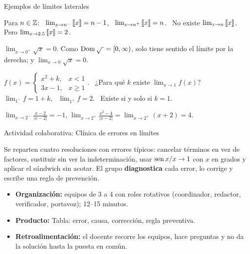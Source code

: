 \documentclass[10pt,aspectratio=169]{beamer}
\begin{document}
\begin{frame}{Ejemplos de límites laterales}
  \begin{ejemplo}
    Para $n\in\mathbb{Z}$: \ $\lim_{x\to n^-}\left\llbracket x\right\rrbracket=n-1$, \ $\lim_{x\to n^+}\left\llbracket x\right\rrbracket=n$. \ No existe $\lim_{x\to n}\left\llbracket x\right\rrbracket$.\\
    Pero $\lim_{x\to2.5}\left\llbracket x\right\rrbracket=2$.
  \end{ejemplo}
  \begin{ejemplo}
    $\lim_{x\to0^+}\sqrt x=0$. Como $\operatorname{Dom}\sqrt{\ }=[0,\infty)$, solo tiene sentido el límite por la derecha; y $\lim_{x\to0}\sqrt x=0$.
  \end{ejemplo}
  \begin{ejemplo}
    $f(x)=\begin{cases}x^2+k,&x<1\\ 3x-1,&x\ge1\end{cases}$. \ ¿Para qué $k$ existe $\lim_{x\to1}f(x)$?\\
    $\lim_{1^-}f=1+k$, \ $\lim_{1^+}f=2$. \ Existe si y solo si $k=1$.
  \end{ejemplo}
  \begin{ejemplo}[17]
    $\displaystyle\lim_{x\to2^-}\frac{x-2}{|x-2|}=-1$, \quad $\displaystyle\lim_{x\to2^+}\frac{x^2-4}{|x-2|}=\lim_{x\to2^+}(x+2)=4$.
  \end{ejemplo}
\end{frame}

\begin{frame}{Actividad colaborativa: Clínica de errores en límites}
  \small
  \begin{activa}
    Se reparten cuatro resoluciones con errores típicos: cancelar términos en vez de factores, sustituir sin ver la indeterminación, usar $\operatorname{sen} x/x\to1$ con $x$ en grados y aplicar el sándwich sin acotar. El grupo \textbf{diagnostica} cada error, lo corrige y escribe una regla de prevención.
  \end{activa}
  \begin{itemize}
    \item \textbf{Organización:} equipos de 3 a 4 con roles rotativos (coordinador, redactor, verificador, portavoz); 12--15 minutos.
    \item \textbf{Producto:} Tabla: error, causa, corrección, regla preventiva.
    \item \textbf{Retroalimentación:} el docente recorre los equipos, hace preguntas y no da la solución hasta la puesta en común.
  \end{itemize}
\end{frame}
\end{document}
